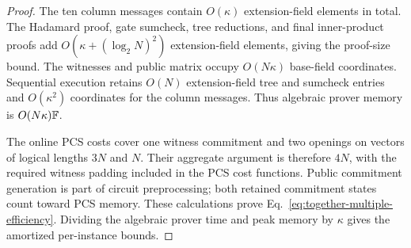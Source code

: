 \begin{proof}
The ten column messages contain \(O(\kappa)\)
extension-field elements in total.
The Hadamard proof, gate sumcheck, tree reductions, and final
inner-product proofs add
\(O(\kappa+(\log_2N)^2)\) extension-field elements,
giving the proof-size bound.
The witnesses and public matrix occupy \(O(N\kappa)\)
base-field coordinates.
Sequential execution retains \(O(N)\) extension-field
tree and sumcheck entries and \(O(\kappa^2)\) coordinates
for the column messages.
Thus algebraic prover memory is \(O(N\kappa){\mathbb{F}}\).

The online PCS costs cover one witness commitment and two
openings on vectors of logical lengths \(3N\) and \(N\).
Their aggregate argument is therefore \(4N\), with the required
witness padding included in the PCS cost functions.
Public commitment generation is part of circuit preprocessing;
both retained commitment states count toward PCS memory.
These calculations prove
Eq.~\eqref{eq:together-multiple-efficiency}.
Dividing the algebraic prover time and peak memory by
\(\kappa\) gives the amortized per-instance bounds.
\end{proof}
